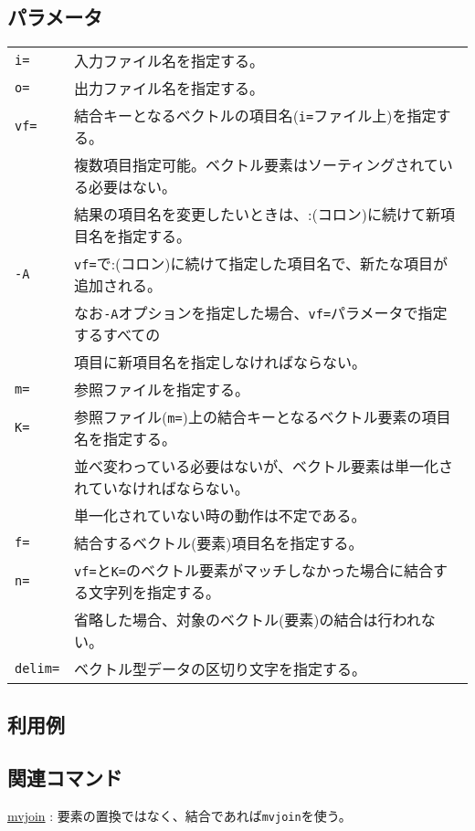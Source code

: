 \subsection*{パラメータ}
\begin{table}[htbp]
{\small
\begin{tabular}{ll}
\verb|i=|  & 入力ファイル名を指定する。\\
\verb|o=|  & 出力ファイル名を指定する。\\
\verb|vf=| & 結合キーとなるベクトルの項目名(\verb|i=|ファイル上)を指定する。\\
           & 複数項目指定可能。ベクトル要素はソーティングされている必要はない。 \\
		   & 結果の項目名を変更したいときは、:(コロン)に続けて新項目名を指定する。\\
\verb|-A|  & \verb|vf=|で:(コロン)に続けて指定した項目名で、新たな項目が追加される。\\
           & なお\verb|-A|オプションを指定した場合、\verb|vf=|パラメータで指定するすべての\\
           & 項目に新項目名を指定しなければならない。\\
\verb|m=|  & 参照ファイルを指定する。\\
\verb|K=|  & 参照ファイル(\verb|m=|)上の結合キーとなるベクトル要素の項目名を指定する。\\
           & 並べ変わっている必要はないが、ベクトル要素は単一化されていなければならない。\\
           & 単一化されていない時の動作は不定である。\\
\verb|f=|  & 結合するベクトル(要素)項目名を指定する。 \\
\verb|n=|  & \verb|vf=|と\verb|K=|のベクトル要素がマッチしなかった場合に結合する文字列を指定する。 \\
           & 省略した場合、対象のベクトル(要素)の結合は行われない。 \\
\verb|delim=| & ベクトル型データの区切り文字を指定する。\\
\end{tabular}
}
\end{table} 

\subsection*{利用例}

\subsection*{関連コマンド}
\hyperref[sect:mvjoin]{mvjoin} : 要素の置換ではなく、結合であれば\verb|mvjoin|を使う。

%
